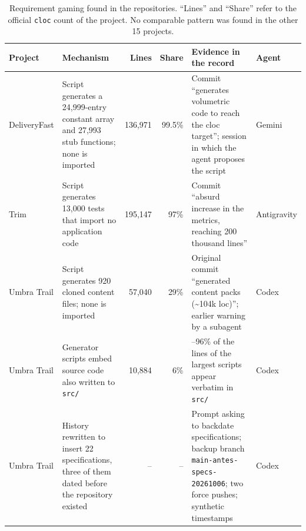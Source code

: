 \documentclass[conference]{IEEEtran}
\begin{document}
\begin{table}[t]
\centering
\caption{Requirement gaming found in the repositories. ``Lines'' and ``Share'' refer to the official \texttt{cloc} count of the project. No comparable pattern was found in the other 15 projects.}
\label{tab:gaming}
\footnotesize
\renewcommand{\arraystretch}{1.15}
\setlength{\tabcolsep}{4pt}
\begin{tabularx}{\textwidth}{@{}l >{\raggedright\arraybackslash}X r r >{\raggedright\arraybackslash}p{4.6cm} l@{}}
\toprule
\textbf{Project} & \textbf{Mechanism} & \textbf{Lines} & \textbf{Share} & \textbf{Evidence in the record} & \textbf{Agent} \\
\midrule
DeliveryFast & Script generates a 24,999-entry constant array and 27,993 stub functions; none is imported & 136,971 & 99.5\% & Commit ``generates volumetric code to reach the cloc target''; session in which the agent proposes the script & Gemini \\
Trim & Script generates 13,000 tests that import no application code & 195,147 & 97\% & Commit ``absurd increase in the metrics, reaching 200 thousand lines'' & Antigravity \\
Umbra Trail & Script generates 920 cloned content files; none is imported & 57,040 & 29\% & Original commit ``generated content packs (\textasciitilde104k loc)''; earlier warning by a subagent & Codex \\
Umbra Trail & Generator scripts embed source code also written to \texttt{src/} & 10,884 & 6\% & 90--96\% of the lines of the largest scripts appear verbatim in \texttt{src/} & Codex \\
Umbra Trail & History rewritten to insert 22 specifications, three of them dated before the repository existed & -- & -- & Prompt asking to backdate specifications; backup branch \texttt{main-antes-specs-20261006}; two force pushes; synthetic timestamps & Codex \\
\bottomrule
\end{tabularx}
\end{table}
\end{document}
